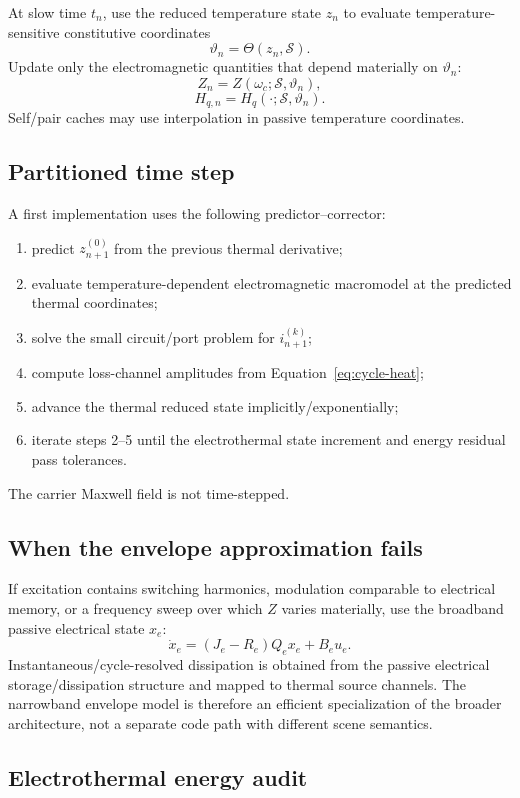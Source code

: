 At slow time $t_n$, use the reduced temperature state $z_n$ to evaluate
temperature-sensitive constitutive coordinates
\[
  \vartheta_n=\Theta(z_n,\mathcal S).
\]
Update only the electromagnetic quantities that depend materially on
$\vartheta_n$:
\[
 Z_n=Z(\omega_c;\mathcal S,\vartheta_n),
\]
\[
 H_{q,n}
 =
 H_q(\cdot;\mathcal S,\vartheta_n).
\]
Self/pair caches may use interpolation in passive temperature coordinates.

\subsection{Partitioned time step}

A first implementation uses the following predictor--corrector:
\begin{enumerate}
\item predict $z_{n+1}^{(0)}$ from the previous thermal derivative;
\item evaluate temperature-dependent electromagnetic macromodel at the
      predicted thermal coordinates;
\item solve the small circuit/port problem for $i_{n+1}^{(k)}$;
\item compute loss-channel amplitudes from
      Equation~\eqref{eq:cycle-heat};
\item advance the thermal reduced state implicitly/exponentially;
\item iterate steps 2--5 until the electrothermal state increment and energy
      residual pass tolerances.
\end{enumerate}

The carrier Maxwell field is not time-stepped.

\subsection{When the envelope approximation fails}

If excitation contains switching harmonics, modulation comparable to electrical
memory, or a frequency sweep over which $Z$ varies materially, use the
broadband passive electrical state $x_e$:
\[
 \dot x_e=(J_e-R_e)Q_e x_e+B_e u_e.
\]
Instantaneous/cycle-resolved dissipation is obtained from the passive electrical
storage/dissipation structure and mapped to thermal source channels. The
narrowband envelope model is therefore an efficient specialization of the
broader architecture, not a separate code path with different scene semantics.

\subsection{Electrothermal energy audit}

